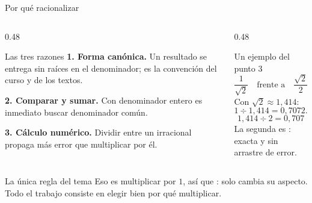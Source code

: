 \documentclass[aspectratio=169,10pt]{beamer}
\begin{document}
\begin{frame}{Por qué racionalizar}
  \scriptsize
  \begin{columns}[T,onlytextwidth]
    \begin{column}{0.48\textwidth}
      \begin{block}{Las tres razones}
        \tiny
        \textbf{1. Forma canónica.} Un resultado se entrega sin raíces en el
        denominador; es la convención del curso y de los textos.

        \vspace{0.06cm}
        \textbf{2. Comparar y sumar.} Con denominador entero es inmediato
        buscar denominador común.

        \vspace{0.06cm}
        \textbf{3. Cálculo numérico.} Dividir entre un irracional propaga más
        error que multiplicar por él.
      \end{block}
    \end{column}
    \begin{column}{0.48\textwidth}
      \begin{exampleblock}{Un ejemplo del punto 3}
        \tiny
        \[ \frac{1}{\sqrt{2}} \quad\text{frente a}\quad \frac{\sqrt{2}}{2} \]
        Con $\sqrt2 \approx 1{,}414$:
        \[ 1 \div 1{,}414 = 0{,}7072\dots \]
        \[ 1{,}414 \div 2 = 0{,}707 \]
        La segunda es : exacta y sin arrastre de
        error.
      \end{exampleblock}
    \end{column}
  \end{columns}

  \vspace{0.1cm}
  \begin{alertblock}{La única regla del tema}
    \scriptsize
     Eso es multiplicar
    por $1$, así que : solo cambia su
    aspecto. Todo el trabajo consiste en elegir bien por qué multiplicar.
  \end{alertblock}
\end{frame}
\end{document}
